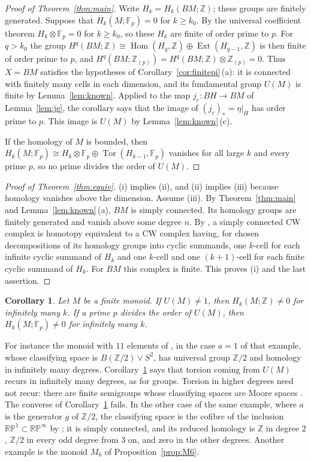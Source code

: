 \documentclass[11pt,a4paper]{article}
\newtheorem{corollary}[theorem]{Corollary}
\theoremstyle{definition}
\newcommand{\Z}{\mathbb{Z}}
\newcommand{\F}{\mathbb{F}}
\newcommand{\Zp}{\Z_{(p)}}
\newcommand{\RP}{\mathbb{RP}}
\newcommand{\Hom}{\operatorname{Hom}}
\newcommand{\Ext}{\operatorname{Ext}}
\newcommand{\Tor}{\operatorname{Tor}}
\begin{document}
\begin{proof}[Proof of Theorem~\ref{thm:main}]
Write $H_k=H_k(BM;\Z)$; these groups are finitely generated. Suppose that
$H_k(M;\F_p)=0$ for $k\ge k_0$. By the universal coefficient theorem
$H_k\otimes\F_p=0$ for $k\ge k_0$, so these $H_k$ are finite of order prime
to $p$. For $q>k_0$ the group
$H^q(BM;\Z)\cong\Hom(H_q,\Z)\oplus\Ext(H_{q-1},\Z)$ is then finite of order
prime to $p$, and $H^q(BM;\Zp)=H^q(BM;\Z)\otimes\Zp=0$. Thus $X=BM$ satisfies
the hypotheses of Corollary~\ref{cor:finitepi}\,(a): it is connected with
finitely many cells in each dimension, and its fundamental group $U(M)$ is
finite by Lemma~\ref{lem:known}. Applied to the map $j_e\colon BH\to BM$ of
Lemma~\ref{lem:je}, the corollary says that the image of $(j_e)_*=\eta|_H$
has order prime to $p$. This image is $U(M)$ by Lemma~\ref{lem:known}\,(c).

If the homology of $M$ is bounded, then $H_k(M;\F_p)\cong
H_k\otimes\F_p\oplus\Tor(H_{k-1},\F_p)$ vanishes for all large $k$ and every
prime $p$, so no prime divides the order of $U(M)$.
\end{proof}

\begin{proof}[Proof of Theorem~\ref{thm:equiv}]
(i) implies (ii), and (ii) implies (iii) because homology vanishes above the
dimension. Assume (iii). By Theorem~\ref{thm:main} and
Lemma~\ref{lem:known}\,(a), $BM$ is simply connected. Its homology groups
are finitely generated and vanish above some degree $n$. By
\cite[Proposition~4C.1]{Ha}, a simply connected CW complex is homotopy
equivalent to a CW complex having, for chosen decompositions of its homology
groups into cyclic summands, one $k$-cell for each infinite cyclic summand of
$H_k$ and one $k$-cell and one $(k+1)$-cell for each finite cyclic summand of
$H_k$. For $BM$ this complex is finite. This proves (i) and the last
assertion.
\end{proof}

\begin{corollary}\label{cor:swan}
Let $M$ be a finite monoid. If $U(M)\neq1$, then $H_k(M;\Z)\ne0$ for
infinitely many $k$. If a prime $p$ divides the order of $U(M)$, then
$H_k(M;\F_p)\neq0$ for infinitely many $k$.
\end{corollary}

For instance the monoid with $11$ elements of \cite[Example~3.4]{BB}, in the
case $a=1$ of that example, whose classifying space is $B(\Z/2)\vee S^2$,
has universal group $\Z/2$ and homology in infinitely many degrees.
Corollary~\ref{cor:swan} says that torsion coming from $U(M)$ recurs in
infinitely many degrees, as for groups. Torsion in higher degrees need not
recur: there are finite semigroups whose classifying spaces are Moore spaces
\cite[Table~1 and Examples~5.4, 5.5]{Sw}. The converse of
Corollary~\ref{cor:swan} fails. In the other case of the same example, where
$a$ is the generator $g$ of $\Z/2$, the classifying space is the cofibre of
the inclusion $\RP^1\subset\RP^\infty$ by \cite[Theorem~A]{BB}; it is simply
connected, and its reduced homology is $\Z$ in degree $2$, $\Z/2$ in every
odd degree from $3$ on, and zero in the other degrees. Another example is
the monoid $M_6$ of Proposition~\ref{prop:M6}.
\end{document}
